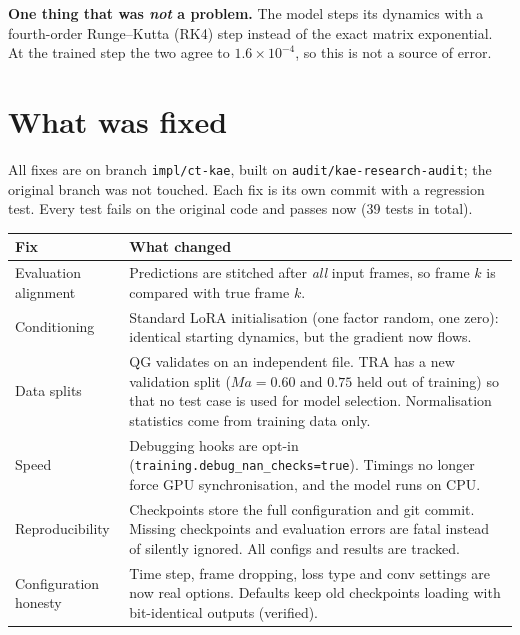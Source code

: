 \documentclass[10.5pt,a4paper]{article}
\begin{document}
\textbf{One thing that was \emph{not} a problem.} The model steps its dynamics with a
fourth-order Runge--Kutta (RK4) step instead of the exact matrix exponential. At the trained
step the two agree to $1.6\times10^{-4}$, so this is not a source of error.

\section{What was fixed}\label{sec:fixes}

All fixes are on branch \texttt{impl/ct-kae}, built on \texttt{audit/kae-research-audit}; the
original branch was not touched. Each fix is its own commit with a regression test. Every test
fails on the original code and passes now (39 tests in total).

\begin{center}\small
\begin{tabularx}{\linewidth}{@{}lY@{}}
\toprule
Fix & What changed\\
\midrule
Evaluation alignment & Predictions are stitched after \emph{all} input frames, so frame $k$
  is compared with true frame $k$.\\
Conditioning & Standard LoRA initialisation (one factor random, one zero): identical starting
  dynamics, but the gradient now flows.\\
Data splits & QG validates on an independent file. TRA has a new validation split
  ($Ma = 0.60$ and $0.75$ held out of training) so that no test case is used for model
  selection. Normalisation statistics come from training data only.\\
Speed & Debugging hooks are opt-in (\texttt{training.debug\_nan\_checks=true}). Timings no
  longer force GPU synchronisation, and the model runs on CPU.\\
Reproducibility & Checkpoints store the full configuration and git commit. Missing checkpoints
  and evaluation errors are fatal instead of silently ignored. All configs and results are
  tracked.\\
Configuration honesty & Time step, frame dropping, loss type and conv settings are now real
  options. Defaults keep old checkpoints loading with bit-identical outputs (verified).\\
\bottomrule
\end{tabularx}
\end{center}

\end{document}
